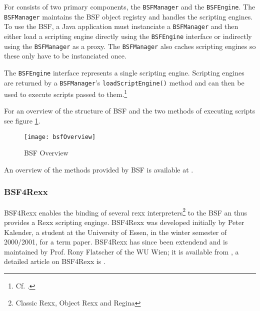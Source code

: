For consists of two primary components, the \texttt{BSFManager} and the \texttt{BSFEngine}. The \texttt{BSFManager} maintains the BSF object registry and handles the scripting engines. To use the BSF, a Java application must instanciate a \texttt{BSFManager} and then either load a scripting engine directly using the \texttt{BSFEngine} interface or indirectly using the \texttt{BSFManager} as a proxy. The \texttt{BSFManager} also caches scripting engines so these only have to be instanciated once.

The \texttt{BSFEngine} interface represents a single scripting engine. Scripting engines are returned by a \texttt{BSFManager}'s \texttt{loadScriptEngine()} method and can then be used to execute scripts passed to them.\footnote{Cf. \cite{BsfManual}.}

For an overview of the structure of BSF and the two methods of executing scripts see figure \ref{fig:bsfOverview}.

\begin{figure}
	\centering
		\texttt{[image: bsfOverview]}
	\caption{BSF Overview}
	\label{fig:bsfOverview}
\end{figure}

An overview of the methods provided by BSF is available at \cite{BsfManual}.

\subsubsection{BSF4Rexx}

BSF4Rexx enables the binding of several rexx interpreters\footnote{Classic Rexx, Object Rexx and Regina} to the BSF an thus provides a Rexx scripting enginge. BSF4Rexx was developed initially by Peter Kalender, a student at the University of Essen, in the winter semester of 2000/2001, for a term paper. \cite{Kale00}
BSF4Rexx has since been extendend and is maintained by Prof. Rony Flatscher of the WU Wien; it is available from \cite{BSF4Rexx},
a detailed article on BSF4Rexx is \cite{Flat01}.
